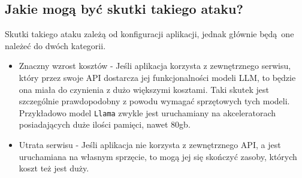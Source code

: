 \documentclass[12pt,aspectratio=169]{beamer}
\begin{document}
\subsection*{Jakie mogą być skutki takiego ataku?}
\begin{frame}

Skutki takiego ataku zależą od konfiguracji aplikacji, jednak głównie będą one
należeć do dwóch kategorii.
\pause

\begin{itemize}
  \item Znaczny wzrost kosztów - Jeśli aplikacja korzysta z zewnętrznego
    serwisu, który przez swoje API dostarcza jej funkcjonalności modeli LLM, to 
    będzie ona miała do czynienia z dużo większymi kosztami. Taki skutek jest
    szczególnie prawdopodobny z powodu wymagać sprzętowych tych modeli.
    Przykładowo model \texttt{Llama} zwykle jest uruchamiany na akceleratorach 
    posiadających duże ilości pamięci\cite{touvron2023llama}, nawet 80gb. \pause
  \item Utrata serwisu - Jeśli aplikacja nie korzysta z zewnętrznego API, a jest
    uruchamiana na własnym sprzęcie, to mogą jej się skończyć zasoby, których
    koszt też jest duży. 
\end{itemize}

\end{frame}
\end{document}
